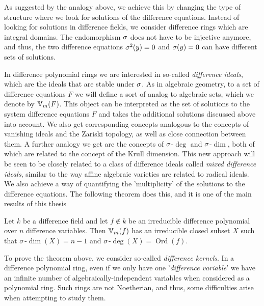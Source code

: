 As suggested by the analogy above, we achieve this by changing the type of structure where we look for solutions of the difference equations. Instead of looking for solutions in difference fields,
we consider difference rings which are integral domains. The endomorphism $\sigma$ does not have to be injective anymore, and thus, the two difference equations $\sigma^2(y) = 0$ and $\sigma(y) = 0$ can have different sets of solutions.

In difference polynomial rings we are interested in so-called \emph{difference ideals}, which are the ideals that are stable under $\sigma$. 
As in algebraic geometry, to a set of difference equations $F$ we will define a sort of analog to algebraic sets, which we denote by $\mathbb{V}_m(F)$. 
This object can be interpreted as the set of solutions to the system difference equations $F$  and takes the additional solutions discussed above into account.
We also get corresponding concepts analogous to the concepts of vanishing ideals and the Zariski topology, as well as close connection between them. 
A further analogy  we get are the concepts of $\sigma$-$\operatorname{deg}$ and $\sigma$-$\dim$, both of which are related to the concept of the Krull dimension.
This new approach will be seen to be closely related to a class of difference ideals called \emph{mixed difference ideals}, similar to the way affine algebraic varieties are related to radical ideals.
We also achieve a way of quantifying the 'multiplicity' of the solutions to the difference equations. The following theorem does this, and it is one of the main results of this thesis

\begin{theorem*}
Let $k$ be a difference field and let $f \notin k$ be an irreducible difference polynomial over $n$ difference variables. 
Then $\mathbb{V}_m(f)$ has an irreducible closed subset $X$ such that $\sigma$-$\dim(X) = n-1$ and $\sigma$-$\operatorname{deg}(X) = \operatorname{Ord}(f)$.
\end{theorem*}

To prove the theorem above, we consider so-called \emph{difference kernels}.
In a difference polynomial ring, even if we only have one '\emph{difference variable}' we have an infinite number of algebraically-independent variables when considered as a polynomial ring. Such rings are not Noetherian, and thus, some difficulties arise when attempting to study them. 

